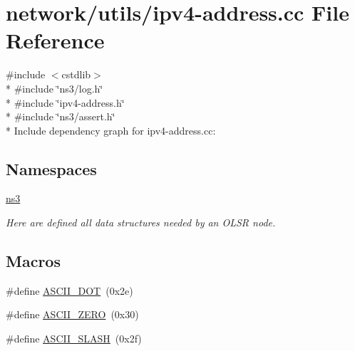 \hypertarget{ipv4-address_8cc}{}\section{network/utils/ipv4-\/address.cc File Reference}
\label{ipv4-address_8cc}
{\ttfamily \#include $<$cstdlib$>$}\\*
{\ttfamily \#include \char`\"{}ns3/log.\+h\char`\"{}}\\*
{\ttfamily \#include \char`\"{}ipv4-\/address.\+h\char`\"{}}\\*
{\ttfamily \#include \char`\"{}ns3/assert.\+h\char`\"{}}\\*
Include dependency graph for ipv4-\/address.cc\+:
\subsection*{Namespaces}
\begin{DoxyCompactItemize}
\item 
 \hyperlink{namespacens3}{ns3}
\begin{DoxyCompactList}\small\item\em Here are defined all data structures needed by an O\+L\+SR node. \end{DoxyCompactList}\end{DoxyCompactItemize}
\subsection*{Macros}
\begin{DoxyCompactItemize}
\item 
\#define \hyperlink{ipv4-address_8cc_a6ec0f0cb1e0c4e317469e4103bec5fd5}{A\+S\+C\+I\+I\+\_\+\+D\+OT}~(0x2e)
\item 
\#define \hyperlink{ipv4-address_8cc_abde11a6ee98560227d0d3889da0408e4}{A\+S\+C\+I\+I\+\_\+\+Z\+E\+RO}~(0x30)
\item 
\#define \hyperlink{ipv4-address_8cc_a05ce5056eb6f531e16086c4b2c186183}{A\+S\+C\+I\+I\+\_\+\+S\+L\+A\+SH}~(0x2f)
\end{DoxyCompactItemize}
